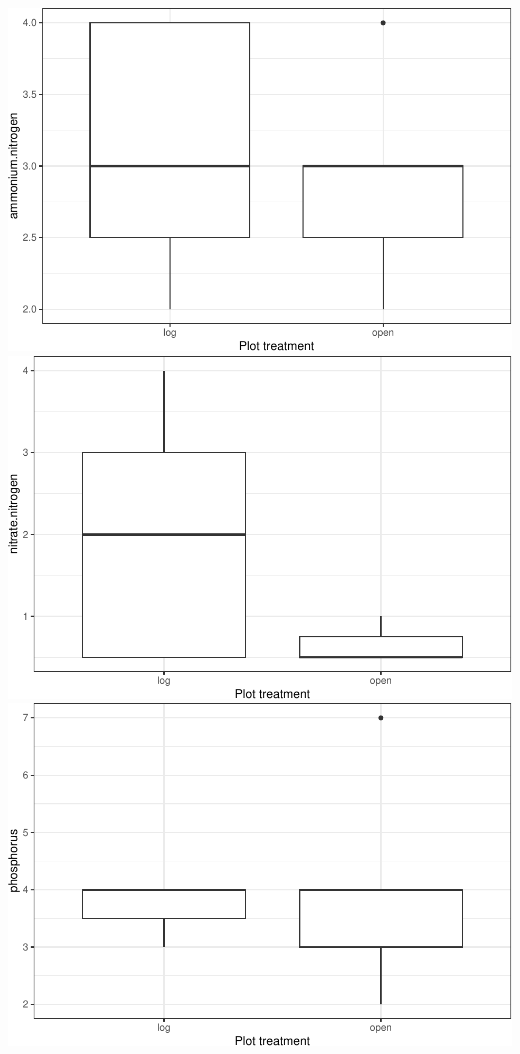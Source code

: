 \documentclass[
]{article}
\begin{document}
\includegraphics{log-project-aubrie-winnie_files/figure-latex/unnamed-chunk-8-1.pdf}
\includegraphics{log-project-aubrie-winnie_files/figure-latex/unnamed-chunk-8-2.pdf}
\includegraphics{log-project-aubrie-winnie_files/figure-latex/unnamed-chunk-8-3.pdf}
\end{document}
